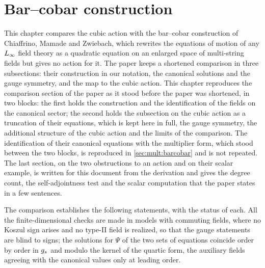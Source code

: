 \section{Bar--cobar construction}
\label{ch:bar-cobar}

This chapter compares the cubic action with the bar--cobar construction of Chiaffrino, Mamade and Zwiebach, which rewrites the equations of motion of any $L_\infty$ field theory as a quadratic equation on an enlarged space of multi-string fields but gives no action for it.
The paper keeps a shortened comparison in three subsections: their construction in our notation, the canonical solutions and the gauge symmetry, and the map to the cubic action.
This chapter reproduces the comparison section of the paper as it stood before the paper was shortened, in two blocks: the first holds the construction and the identification of the fields on the canonical sector; the second holds the subsection on the cubic action as a truncation of their equations, which is kept here in full, the gauge symmetry, the additional structure of the cubic action and the limits of the comparison.
The identification of their canonical equations with the multiplier form, which stood between the two blocks, is reproduced in \cref{sec:mult:barcobar} and is not repeated.
The last section, on the two obstructions to an action and on their scalar example, is written for this document from the derivation and gives the degree count, the self-adjointness test and the scalar computation that the paper states in a few sentences.

The comparison establishes the following statements, with the status of each.
All the finite-dimensional checks are made in models with commuting fields, where no Koszul sign arises and no type-II field is realized, so that the gauge statements are blind to signs; the solutions for $\Psi$ of the two sets of equations coincide order by order in $g_s$ and modulo the kernel of the quartic form, the auxiliary fields agreeing with the canonical values only at leading order.

